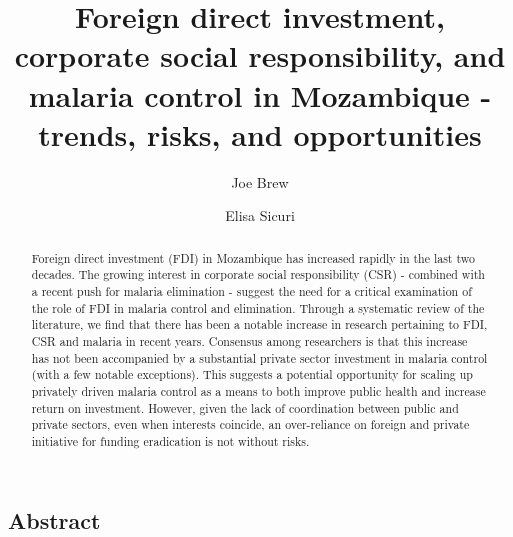\documentclass[]{elsarticle} %
\begin{document}
\begin{frontmatter}

  \title{Foreign direct investment, corporate social responsibility, and malaria
control in Mozambique - trends, risks, and opportunities}
    \author[isglobal,cism,vu]{Joe Brew}
    \author[isglobal,icl,cism]{Elisa Sicuri}
  
      \address[isglobal]{Barcelona Institute for Global Health, c/ Rosselló, 132, 5è 2a. 08036,
Barcelona, Spain}
    \address[icl]{Imperial College London, South Kensington Campus, London SW7 2AZ, U.K.}
    \address[cism]{Centro de Investigação em Saúde de Manhiça, Vila da Manhiça, Bairro
Cambeve, Rua 12, Distrito da Manhiça, CP 1929, Maputo, Mozambique}
    \address[vu]{VU University Amsterdam, De Boelelaan 1105, 1081 HV Amsterdam,
Netherlands}
  
  \begin{abstract}
  Foreign direct investment (FDI) in Mozambique has increased rapidly in
  the last two decades. The growing interest in corporate social
  responsibility (CSR) - combined with a recent push for malaria
  elimination - suggest the need for a critical examination of the role of
  FDI in malaria control and elimination. Through a systematic review of
  the literature, we find that there has been a notable increase in
  research pertaining to FDI, CSR and malaria in recent years. Consensus
  among researchers is that this increase has not been accompanied by a
  substantial private sector investment in malaria control (with a few
  notable exceptions). This suggests a potential opportunity for scaling
  up privately driven malaria control as a means to both improve public
  health and increase return on investment. However, given the lack of
  coordination between public and private sectors, even when interests
  coincide, an over-reliance on foreign and private initiative for funding
  eradication is not without risks.
  \end{abstract}
  
 \end{frontmatter}

\subsection{Abstract}\label{abstract}
\end{document}
